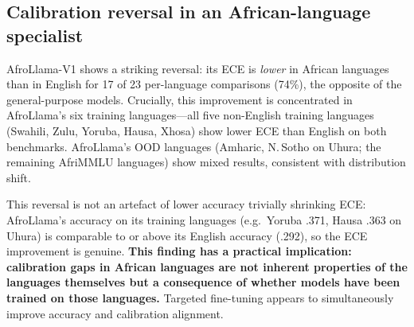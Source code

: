 \documentclass[11pt,a4paper]{article}
\begin{document}
\subsection{Calibration reversal in an African-language specialist}
\label{sec:reversal}

AfroLlama-V1 shows a striking reversal: its ECE is \emph{lower} in African
languages than in English for 17 of 23 per-language comparisons (74\%), the
opposite of the general-purpose models. Crucially, this improvement is
concentrated in AfroLlama's six training languages---all five non-English
training languages (Swahili, Zulu, Yoruba, Hausa, Xhosa) show lower ECE than
English on both benchmarks. AfroLlama's OOD languages (Amharic, N.\,Sotho on
Uhura; the remaining AfriMMLU languages) show mixed results, consistent with
distribution shift.

This reversal is not an artefact of lower accuracy trivially shrinking ECE:
AfroLlama's accuracy on its training languages (e.g.\ Yoruba .371, Hausa .363
on Uhura) is comparable to or above its English accuracy (.292), so the ECE
improvement is genuine. \textbf{This finding has a practical implication:
calibration gaps in African languages are not inherent properties of the
languages themselves but a consequence of whether models have been trained on
those languages.} Targeted fine-tuning appears to simultaneously improve accuracy
and calibration alignment.
\end{document}
